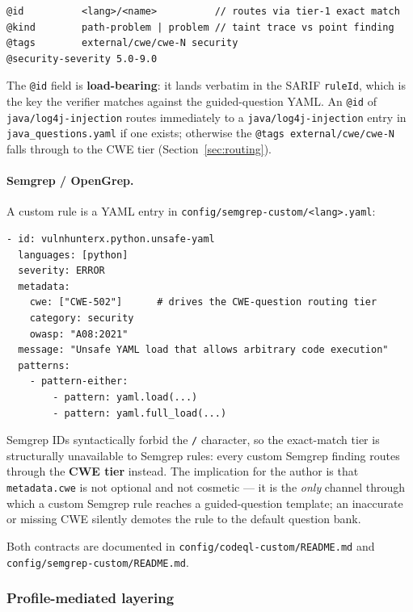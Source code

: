 \documentclass[11pt,a4paper]{article}
\begin{document}
\begin{lstlisting}[language={}]
@id          <lang>/<name>          // routes via tier-1 exact match
@kind        path-problem | problem // taint trace vs point finding
@tags        external/cwe/cwe-N security
@security-severity 5.0-9.0
\end{lstlisting}

The \texttt{@id} field is \textbf{load-bearing}: it lands verbatim in
the SARIF \texttt{ruleId}, which is the key the verifier matches
against the guided-question YAML. An \texttt{@id} of
\texttt{java/log4j-injection} routes immediately to a
\texttt{java/log4j-injection} entry in \texttt{java\_questions.yaml} if
one exists; otherwise the \texttt{@tags external/cwe/cwe-N} falls
through to the CWE tier
(Section~\ref{sec:routing}).

\paragraph{Semgrep / OpenGrep.} A custom rule is a YAML entry in
\texttt{config/semgrep-custom/<lang>.yaml}:

\begin{lstlisting}[language=yamlex]
- id: vulnhunterx.python.unsafe-yaml
  languages: [python]
  severity: ERROR
  metadata:
    cwe: ["CWE-502"]      # drives the CWE-question routing tier
    category: security
    owasp: "A08:2021"
  message: "Unsafe YAML load that allows arbitrary code execution"
  patterns:
    - pattern-either:
        - pattern: yaml.load(...)
        - pattern: yaml.full_load(...)
\end{lstlisting}

Semgrep IDs syntactically forbid the \texttt{/} character, so the
exact-match tier is structurally unavailable to Semgrep rules: every
custom Semgrep finding routes through the \textbf{CWE tier} instead.
The implication for the author is that \texttt{metadata.cwe} is not
optional and not cosmetic --- it is the \emph{only} channel through
which a custom Semgrep rule reaches a guided-question template; an
inaccurate or missing CWE silently demotes the rule to the default
question bank.

Both contracts are documented in
\texttt{config/codeql-custom/README.md} and
\texttt{config/semgrep-custom/README.md}.

\subsubsection{Profile-mediated layering}
\end{document}
